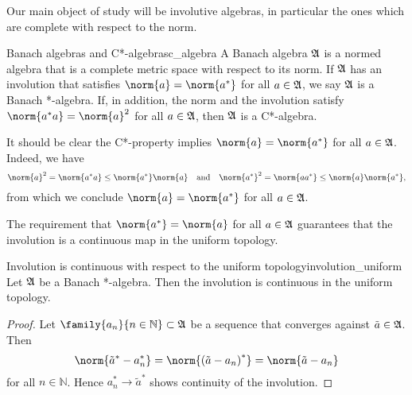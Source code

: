 Our main object of study will be involutive algebras, in particular the ones which are complete with respect to the norm.
\begin{definition}{Banach algebras and C*-algebras}{c_algebra}
    A Banach algebra \(\mathfrak{A}\) is a normed algebra that is a complete metric space with respect to its norm. If \(\mathfrak{A}\) has an involution that satisfies \(\norm{a} = \norm{a^*}\) for all \(a \in \mathfrak{A}\), we say \(\mathfrak{A}\) is a Banach *-algebra. If, in addition, the norm and the involution satisfy \(\norm{a^*a} = \norm{a}^2\) for all \(a \in \mathfrak{A}\), then \(\mathfrak{A}\) is a C*-algebra.
\end{definition}
\begin{remark}
    It should be clear the C*-property implies \(\norm{a} = \norm{a^*}\) for all \(a \in \mathfrak{A}\). Indeed, we have
    \begin{equation*}
        \norm{a}^2 = \norm{a^*a} \leq \norm{a^*}\norm{a}
        \quad\text{and}\quad
        \norm{a^*}^2 = \norm{aa^*} \leq \norm{a}\norm{a^*},
    \end{equation*}
    from which we conclude \(\norm{a} = \norm{a^*}\) for all \(a \in \mathfrak{A}\).
\end{remark}
The requirement that \(\norm{a^*} = \norm{a}\) for all \(a \in \mathfrak{A}\) guarantees that the involution is a continuous map in the uniform topology.
\begin{proposition}{Involution is continuous with respect to the uniform topology}{involution_uniform}
    Let \(\mathfrak{A}\) be a Banach *-algebra. Then the involution is continuous in the uniform topology.
\end{proposition}
\begin{proof}
    Let \(\family{a_n}{n \in \mathbb{N}} \subset \algebra{A}\) be a sequence that converges against \(\tilde{a} \in \mathfrak{A}\). Then
    \begin{equation*}
        \norm{\tilde{a}^* - a_n^*} = \norm{\left(\tilde{a} - a_n\right)^*} = \norm{\tilde{a} - a_n}
    \end{equation*}
    for all \(n \in \mathbb{N}\). Hence \(a_n^* \to \tilde{a}^*\) shows continuity of the involution.
\end{proof}

